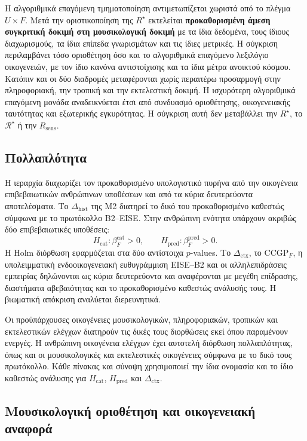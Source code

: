 \documentclass[11pt,a4paper]{article}
\begin{document}
Η αλγοριθμικά επαγόμενη τμηματοποίηση αντιμετωπίζεται χωριστά από το πλέγμα \(U\times F\). Μετά την οριστικοποίηση της $R^\star$ εκτελείται \textbf{προκαθορισμένη άμεση συγκριτική δοκιμή στη μουσικολογική δοκιμή} με τα ίδια δεδομένα, τους ίδιους διαχωρισμούς, τα ίδια επίπεδα γνωρισμάτων και τις ίδιες μετρικές. Η σύγκριση περιλαμβάνει τόσο οριοθέτηση όσο και το αλγοριθμικά επαγόμενο λεξιλόγιο οικογενειών, με τον ίδιο κανόνα αντιστοίχισης και τα ίδια μέτρα ανοικτού κόσμου. Κατόπιν και οι δύο διαδρομές μεταφέρονται χωρίς περαιτέρω προσαρμογή στην πληροφοριακή, την τροπική και την εκτελεστική δοκιμή. Η ισχυρότερη αλγοριθμικά επαγόμενη μονάδα αναδεικνύεται έτσι από συνδυασμό οριοθέτησης, οικογενειακής ταυτότητας και εξωτερικής εγκυρότητας. Η σύγκριση αυτή δεν μεταβάλλει την $R^\star$, το $\mathcal R^\star$ ή την $R_{\mathrm{sens}}$.

\subsection{Πολλαπλότητα}\label{app:stats-multiplicity}

Η ιεραρχία διαχωρίζει τον προκαθορισμένο υπολογιστικό πυρήνα από την οικογένεια επιβεβαιωτικών ανθρώπινων υποθέσεων και από τα κύρια δευτερεύοντα αποτελέσματα. Το $\Delta_{\mathrm{hist}}$ της M2 διατηρεί το δικό του προκαθορισμένο καθεστώς σύμφωνα με το πρωτόκολλο B2--EISE. Στην ανθρώπινη ενότητα υπάρχουν ακριβώς δύο επιβεβαιωτικές υποθέσεις:
\[
H_{\mathrm{cat}}:\beta_F^{\mathrm{cat}}>0,
\qquad
H_{\mathrm{pred}}:\beta_F^{\mathrm{pred}}>0.
\]
Η Holm διόρθωση εφαρμόζεται στα δύο αντίστοιχα $p$-values. Το $\Delta_{\mathrm{ctx}}$, το $\mathrm{CCGP}_F$, η υπολειμματική ενδοοικογενειακή ευθυγράμμιση EISE--B2 και οι αλληλεπιδράσεις εμπειρίας δηλώνονται ως κύρια δευτερεύοντα και αναφέρονται με μεγέθη επίδρασης, διαστήματα αβεβαιότητας και το προκαθορισμένο καθεστώς ανάλυσής τους. Η βιωματική απόκριση αναλύεται διερευνητικά.

Οι προϋπάρχουσες οικογένειες μουσικολογικών, πληροφοριακών, τροπικών και εκτελεστικών ελέγχων διατηρούν τις δικές τους διορθώσεις εκεί όπου παραμένουν ενεργές. Η ανθρώπινη οικογένεια ελέγχων έχει αυτοτελή διόρθωση πολλαπλότητας, όπως και οι μουσικολογικές και εκτελεστικές οικογένειες σύμφωνα με το δικό τους πρωτόκολλο. Κάθε πίνακας και σύνοψη χρησιμοποιεί την ίδια ονομασία και το ίδιο καθεστώς ανάλυσης για $H_{\mathrm{cat}}$, $H_{\mathrm{pred}}$ και $\Delta_{\mathrm{ctx}}$.

\subsection{Μουσικολογική οριοθέτηση και οικογενειακή αναφορά}\label{app:stats-axisA}
\end{document}
